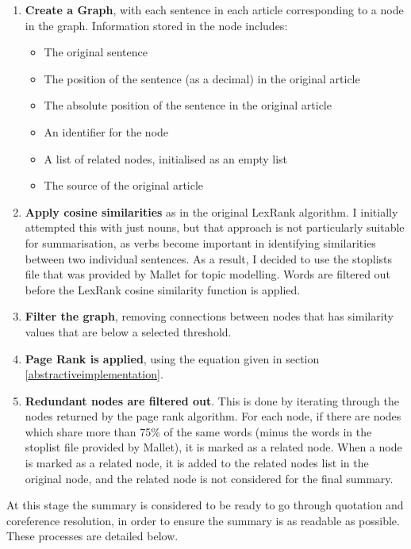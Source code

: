 \documentclass[12pt]{article}
\begin{document}
\begin{enumerate}
	\item \textbf{Create a Graph}, with each sentence in each article corresponding to a node in the graph. Information stored in the node includes:
		\begin{itemize}
			\item The original sentence
			\item The position of the sentence (as a decimal) in the original article
			\item The absolute position of the sentence in the original article
			\item An identifier for the node
			\item A list of related nodes, initialised as an empty list
			\item The source of the original article \\
		\end{itemize}
	\item \textbf{Apply cosine similarities} as in the original LexRank algorithm. I initially attempted this with just nouns, but that approach is not particularly suitable for summarisation, as verbs become important in identifying similarities between two individual sentences. As a result, I decided to use the stoplists file that was provided by Mallet for topic modelling. Words are filtered out before the LexRank cosine similarity function is applied. \\
	\item \textbf{Filter the graph}, removing connections between nodes that has similarity values that are below a selected threshold. \\
	\item \textbf{Page Rank is applied}, using the equation given in section \ref{abstractiveimplementation}. \\
	\item \textbf{Redundant nodes are filtered out}. This is done by iterating through the nodes returned by the page rank algorithm. For each node, if there are nodes which share more than 75\% of the same words (minus the words in the stoplist file provided by Mallet), it is marked as a related node. When a node is marked as a related node, it is added to the related nodes list in the original node, and the related node is not considered for the final summary. \\ 
\end{enumerate}

At this stage the summary is considered to be ready to go through quotation and coreference resolution, in order to ensure the summary is as readable as possible. These processes are detailed below.
\end{document}
